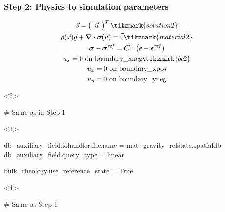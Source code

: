 \documentclass[aspectratio=169]{beamer}
\begin{document}
\begin{frame}[t,fragile]
  \frametitle{Step 2: Physics to simulation parameters}
  \summary{}

  \begin{minipage}[t]{0.3\textwidth}
    {\scriptsize
    \begin{gather*}
    \vec{s} = \left(\begin{array}{c} \vec{u} \end{array}\right)^T \tikzmark{solution2}\\
    \rho(\vec{x}) \vec{g} + \tensor{\nabla} \cdot \tensor{\sigma}(\vec{u}) = \vec{0} \tikzmark{material2}\\
    \tensor{\sigma} - \tensor{\sigma}^\mathit{ref} = \tensor{C} : \left(\tensor{\epsilon}-\tensor{\epsilon}^\mathit{ref}\right) \\
    u_x = 0 \text{ on boundary\_xneg} \tikzmark{bc2}\\
    u_x = 0 \text{ on boundary\_xpos} \\
    u_y = 0 \text{ on boundary\_yneg} \\
    \end{gather*}}
  \end{minipage}
  \hfill
  \begin{minipage}[t]{0.67\textwidth}
    \begin{onlyenv}<2>
      \begin{cfgcode}
        # Same as in Step 1
      \end{cfgcode}
    \end{onlyenv}
    \begin{onlyenv}<3>
      \begin{cfgcode}
        db_auxiliary_field.iohandler.filename = mat_gravity_refstate.spatialdb
        db_auxiliary_field.query_type = linear

        bulk_rheology.use_reference_state = True
      \end{cfgcode}
    \end{onlyenv}
    \begin{onlyenv}<4>
      \begin{cfgcode}
        # Same as Step 1
      \end{cfgcode}
    \end{onlyenv}
  \end{minipage}

  
\end{frame}
\end{document}
